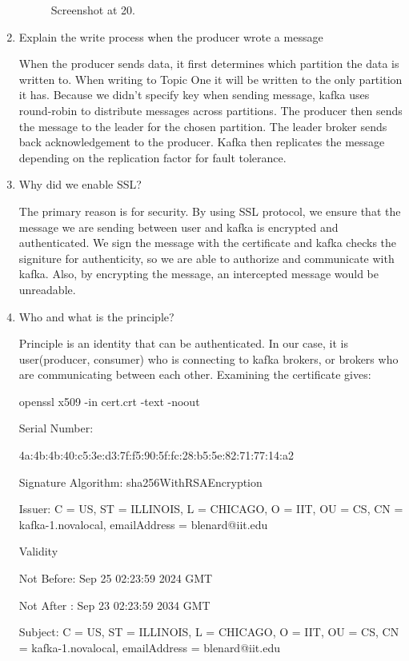 \documentclass{article}
\begin{document}
\begin{enumerate}
\begin{figure}[H]
    \caption{Screenshot at 20.}
  \end{figure}
  \item Explain the write process when the producer wrote a message

  When the producer sends data, it first determines which partition the data is written to.
  When writing to Topic One it will be written to the only partition it has.
  Because we didn't specify key when sending message, kafka uses round-robin to distribute messages across partitions.
  The producer then sends the message to the leader for the chosen partition.
  The leader broker sends back acknowledgement to the producer.
  Kafka then replicates the message depending on the replication factor for fault tolerance.

  \item Why did we enable SSL?

  The primary reason is for security.
  By using SSL protocol, we ensure that the message we are sending between user and kafka is encrypted and authenticated.
  We sign the message with the certificate and kafka checks the signiture for authenticity, so we are able to authorize and communicate with kafka.
  Also, by encrypting the message, an intercepted message would be unreadable.

  \item Who and what is the principle?

  Principle is an identity that can be authenticated.
  In our case, it is user(producer, consumer) who is connecting to kafka brokers, or brokers who are communicating between each other.
  Examining the certificate gives:
  
  openssl x509 -in cert.crt -text -noout

        Serial Number:

            4a:4b:4b:40:c5:3e:d3:7f:f5:90:5f:fc:28:b5:5e:82:71:77:14:a2

        Signature Algorithm: sha256WithRSAEncryption

        Issuer: C = US, ST = ILLINOIS, L = CHICAGO, O = IIT, OU = CS, CN = kafka-1.novalocal, emailAddress = blenard@iit.edu

        Validity

            Not Before: Sep 25 02:23:59 2024 GMT

            Not After : Sep 23 02:23:59 2034 GMT

        Subject: C = US, ST = ILLINOIS, L = CHICAGO, O = IIT, OU = CS, CN = kafka-1.novalocal, emailAddress = blenard@iit.edu


\end{enumerate}
\end{document}

